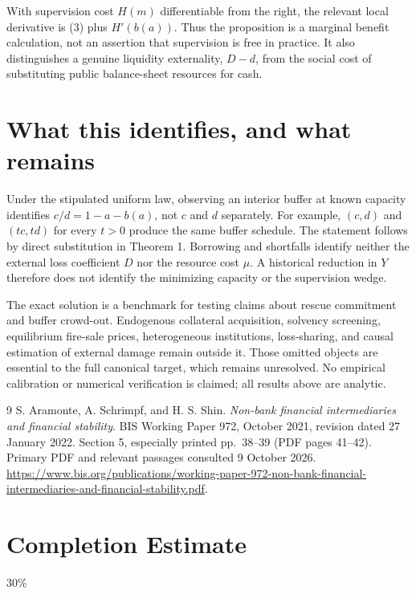 \documentclass[11pt]{article}
\theoremstyle{remark}
\begin{document}
With supervision cost $H(m)$ differentiable from the right, the relevant
local derivative is (3) plus $H'(b(a))$. Thus the proposition is a marginal
benefit calculation, not an assertion that supervision is free in practice.
It also distinguishes a genuine liquidity externality, $D-d$, from the
social cost of substituting public balance-sheet resources for cash.

\section{What this identifies, and what remains}
Under the stipulated uniform law, observing an interior buffer at known
capacity identifies $c/d=1-a-b(a)$, not $c$ and $d$ separately. For example,
$(c,d)$ and $(tc,td)$ for every $t>0$ produce the same buffer schedule.
The statement follows by direct substitution in Theorem 1. Borrowing and
shortfalls identify neither the external loss coefficient $D$ nor the
resource cost $\mu$. A historical reduction in $Y$ therefore does not
identify the minimizing capacity or the supervision wedge.

The exact solution is a benchmark for testing claims about rescue
commitment and buffer crowd-out. Endogenous collateral acquisition,
solvency screening, equilibrium fire-sale prices, heterogeneous institutions,
loss-sharing, and causal estimation of external damage remain outside it.
Those omitted objects are essential to the full canonical target, which
remains unresolved. No empirical calibration or numerical verification is
claimed; all results above are analytic.

\begin{thebibliography}{9}
 S. Aramonte, A. Schrimpf, and H. S. Shin.
\emph{Non-bank financial intermediaries and financial stability}.
BIS Working Paper 972, October 2021, revision dated 27 January 2022.
Section 5, especially printed pp.~38--39 (PDF pages 41--42).
Primary PDF and relevant passages consulted 9 October 2026.
\url{https://www.bis.org/publications/working-paper-972-non-bank-financial-intermediaries-and-financial-stability.pdf}.
\end{thebibliography}

\section{Completion Estimate}
30\%
\end{document}
